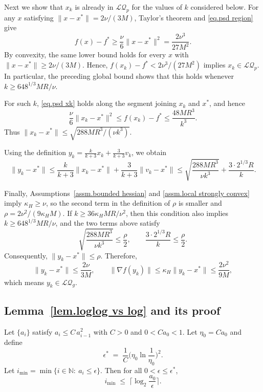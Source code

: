 \documentclass[moor,sglanonrev]{informs4}
\begin{document}
\begin{APPENDICES}
{        Next we show that $x_k$ is already in $\mathcal{LQ}_p$ for the values of $k$
        considered below. For any $x$ satisfying
        $\|x-x^*\|=2\nu/(3M)$, Taylor's theorem and \eqref{eq.psd region} give
        \[
            f(x)-f^*
            \geq \frac{\nu}{6}\|x-x^*\|^2
            = \frac{2\nu^3}{27M^2}.
        \]
        By convexity, the same lower bound holds for every
        $x$ with $\|x-x^*\|\geq 2\nu/(3M)$. Hence,
        \(f(x_k)-f^*<2\nu^3/(27M^2)\) implies $x_k\in\mathcal{LQ}_p$.
        In particular, the preceding global bound shows that this holds whenever
        \(k\geq 648^{1/3}MR/\nu\).

        For such $k$, \eqref{eq.psd xk} holds along the segment joining $x_k$ and $x^*$,
        and hence
        \[
            \frac{\nu}{6}\|x_k-x^*\|^2
            \leq f(x_k)-f^*
            \leq \frac{48MR^3}{k^3}.
        \]
        Thus \(\|x_k-x^*\|\leq \sqrt{288MR^3/(\nu k^3)}\).

        Using the definition
        \(y_k=\frac{k}{k+3}x_k+\frac{3}{k+3}v_k\), we obtain
        \[
            \|y_k-x^*\|
            \leq \frac{k}{k+3}\|x_k-x^*\|
            +\frac{3}{k+3}\|v_k-x^*\|
            \leq \sqrt{\frac{288MR^3}{\nu k^3}}
            +\frac{3\cdot 2^{1/3}R}{k}.
        \]

        Finally, Assumptions~\ref{assm.bounded hessian} and
        \ref{assm.local strongly convex} imply $\kappa_H\geq \nu$, so the second
        term in the definition of \(\rho\) is smaller and
        \(\rho=2\nu^2/(9\kappa_HM)\). If
        \(k\geq 36\kappa_H M R/\nu^2\), then this condition also implies
        \(k\geq 648^{1/3}MR/\nu\),
        and the two terms above satisfy
        \[
            \sqrt{\frac{288MR^3}{\nu k^3}}
            \leq \frac{\rho}{2},
            \qquad
            \frac{3\cdot 2^{1/3}R}{k}
            \leq \frac{\rho}{2}.
        \]
        Consequently, \(\|y_k-x^*\|\leq \rho\).
        Therefore,
        \[
            \|y_k-x^*\|\leq \frac{2\nu}{3M},
            \qquad
            \|\nabla f(y_k)\|
            \leq \kappa_H\|y_k-x^*\|
            \leq \frac{2\nu^2}{9M},
        \]
        which means $y_k\in\mathcal{LQ}_g$.
        \Halmos
        \endproof
    }

    \subsection*{Lemma~\ref{lem.loglog vs log} and its proof}
    {\color{red}
        \begin{lemma}\label{lem.loglog vs log}
            Let $\{a_i\}$ satisfy $a_i \le C\,a_{i-1}^2$ with $C>0$ and $0<Ca_0<1$. Let $\eta_0 = Ca_0$ and define
            \[
                \epsilon^* \;=\; \frac{1}{C} \Big(\eta_0\ln\!\frac{1}{\eta_0}\Big)^2.
            \]
            Let $i_{\min} = \min\{i\in\mathbb{N}:\ a_i\le \epsilon\}$. Then for all $0 < \epsilon \leq \epsilon^*$,
            \[
                i_{\min}\;\le\;\Big\lceil \log_2\!\frac{a_0}{\epsilon}\Big\rceil.
            \]
        \end{lemma}

}
\end{APPENDICES}
\end{document}

